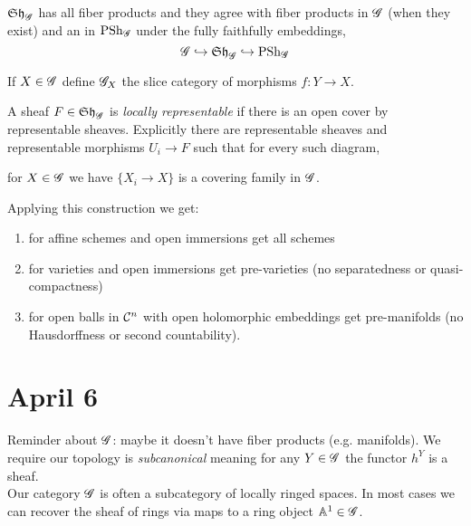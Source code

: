 \documentclass[12pt]{article}
\begin{document}
\begin{exercise}
$\mathfrak{Sh}_{\mathscr{G}}$ has all fiber products and they agree with fiber products in $\mathscr{G}$ (when they exist) and an in $\mathrm{PSh}_{\mathscr{G}}$ under the fully faithfully embeddings,
\[ \mathscr{G} \hookrightarrow \mathfrak{Sh}_{\mathscr{G}} \hookrightarrow \mathrm{PSh}_{\mathscr{G}} \]
\end{exercise}

\begin{defn}
If $X \in \mathscr{G}$ define $\mathscr{G}_X$ the slice category of morphisms $f : Y \to X$.
\end{defn}

\begin{defn}
A sheaf $F \in \mathfrak{Sh}_{\mathscr{G}}$ is \textit{locally representable} if there is an open cover by representable sheaves. Explicitly there are representable sheaves and representable morphisms $U_i \to F$ such that for every such diagram,
\begin{center}
\end{center}
for $X \in \mathscr{G}$ we have $\{ X_i \to X \}$ is a covering family in $\mathscr{G}$.  
\end{defn}

\begin{rmk}
Applying this construction we get:
\begin{enumerate}
\item for affine schemes and open immersions get all schemes
\item for varieties and open immersions get pre-varieties (no separatedness or quasi-compactness)
\item for open balls in $\mathcal{C}^n$ with open holomorphic embeddings get pre-manifolds (no Hausdorffness or second countability).
\end{enumerate}
\end{rmk}


\section{April 6}


\newcommand{\LRep}{\mathrm{LRep}}
\newcommand{\AffSch}{\mathrm{AffSch}}

Reminder about $\mathscr{G}$: maybe it doesn't have fiber products (e.g. manifolds). We require our topology is \textit{subcanonical} meaning for any $Y \in \mathscr{G}$ the functor $h^Y$ is a sheaf. 
\bigskip\\
Our category $\mathscr{G}$ is often a subcategory of locally ringed spaces. In most cases we can recover the sheaf of rings via maps to a ring object $\mathbb{A}^1 \in \mathscr{G}$. 
\end{document}
